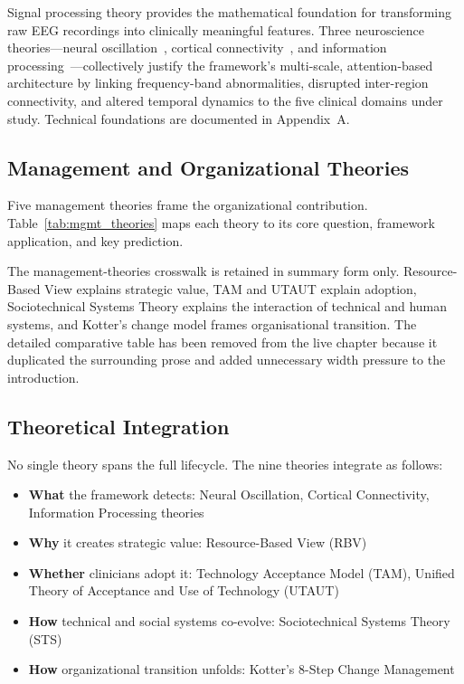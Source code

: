 \label{tab:domain_theories}

Signal processing theory provides the mathematical foundation for transforming raw EEG recordings into clinically meaningful features. Three neuroscience theories---neural oscillation~\cite{buzsaki2012brain}, cortical connectivity~\cite{niedermeyer2005eeg}, and information processing~\cite{roy2019eeg}---collectively justify the framework's multi-scale, attention-based architecture by linking frequency-band abnormalities, disrupted inter-region connectivity, and altered temporal dynamics to the five clinical domains under study. Technical foundations are documented in Appendix~A.

\subsection{Management and Organizational Theories}

Five management theories frame the organizational contribution. Table~\ref{tab:mgmt_theories} maps each theory to its core question, framework application, and key prediction.


The management-theories crosswalk is retained in summary form only. Resource-Based View explains strategic value, TAM and UTAUT explain adoption, Sociotechnical Systems Theory explains the interaction of technical and human systems, and Kotter's change model frames organisational transition. The detailed comparative table has been removed from the live chapter because it duplicated the surrounding prose and added unnecessary width pressure to the introduction.

\label{tab:mgmt_theories}

\subsection{Theoretical Integration}

No single theory spans the full lifecycle. The nine theories integrate as follows:
\begin{itemize}
    \item \textbf{What} the framework detects: Neural Oscillation, Cortical Connectivity, Information Processing theories
    \item \textbf{Why} it creates strategic value: Resource-Based View (RBV)
    \item \textbf{Whether} clinicians adopt it: Technology Acceptance Model (TAM), Unified Theory of Acceptance and Use of Technology (UTAUT)
    \item \textbf{How} technical and social systems co-evolve: Sociotechnical Systems Theory (STS)
    \item \textbf{How} organizational transition unfolds: Kotter's 8-Step Change Management
\end{itemize}

